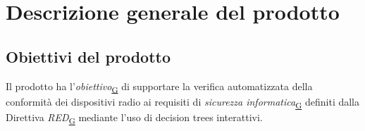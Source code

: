 \documentclass[a4paper,12pt]{article}
\begin{document}
    \newpage

    \section{Descrizione generale del prodotto}
    \subsection{Obiettivi del prodotto}
        Il prodotto ha l'\textit{obiettivo}\textsubscript{\href{https://atlasteam9.github.io/Atlas/glossario.html\#Obiettivo}{G}} di supportare la verifica automatizzata della conformità dei dispositivi radio ai requisiti di \textit{sicurezza informatica}\textsubscript{\href{https://atlasteam9.github.io/Atlas/glossario.html\#Sicurezzainformatica}{G}} definiti dalla Direttiva \textit{RED}\textsubscript{\href{https://atlasteam9.github.io/Atlas/glossario.html\#RED}{G}} mediante l'uso di decision trees interattivi.
    
\end{document}
